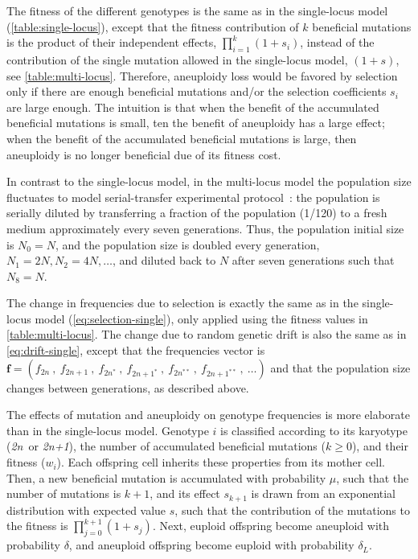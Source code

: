 \documentclass[12pt]{extarticle}
\let\vec\mathbf
\newcommand{\euwt}{\emph{2n}}
\newcommand{\anwt}{\emph{2n+1}}
\begin{document}
The fitness of the different genotypes is the same as in the single-locus model (\autoref{table:single-locus}), except that the fitness contribution of $k$ beneficial mutations is the product of their independent effects, $\prod_{i=1}^k(1+s_i)$, instead of the contribution of the single mutation allowed in the single-locus model, $(1+s)$, see \autoref{table:multi-locus}.
Therefore, aneuploidy loss would be favored by selection only if there are enough beneficial mutations and/or the selection coefficients $s_i$ are large enough. The intuition is that when the benefit of the accumulated beneficial mutations is small, ten the benefit of aneuploidy has a large effect; when the benefit of the accumulated beneficial mutations is large, then aneuploidy is no longer beneficial due of its fitness cost.

In contrast to the single-locus model, in the multi-locus model the population size fluctuates to model serial-transfer experimental protocol~\citep{Yona2012}: the population is serially diluted by transferring a fraction of the population (1/120) to a fresh medium approximately every seven generations. 
Thus, the population initial size is $N_0 = N$, and the population size is doubled every generation, $N_1=2N, N_2=4N, \ldots$, and diluted back to $N$ after seven generations such that $N_8=N$.

The change in frequencies due to selection is exactly the same as in the single-locus model (\autoref{eq:selection-single}), only applied using the fitness values in \autoref{table:multi-locus}. The change due to random genetic drift is also the same as in \autoref{eq:drift-single}, except that the frequencies vector is $\vec{f}=(f_{2n}\ ,\ f_{2n+1}\ ,\ f_{2n^*}\ ,\ f_{2n+1^*}\ ,\ f_{2n^{**}}\ ,\ f_{2n+1^{**}}\ ,\ \ldots)$ and that the population size changes between generations, as described above.

The effects of mutation and aneuploidy on genotype frequencies is more elaborate than in the single-locus model.
Genotype $i$ is classified according to its karyotype (\euwt\ or \anwt), the number of accumulated beneficial mutations ($k \ge 0$), and their fitness ($w_i$).
Each offspring cell inherits these properties from its mother cell.
Then, a new beneficial mutation is accumulated with probability $\mu$, such that the number of mutations is $k+1$, and its effect $s_{k+1}$ is drawn from an exponential distribution with expected value $s$, such that the contribution of the mutations to the fitness is $\prod_{j=0}^{k+1}{(1+s_j)}$.
Next, euploid offspring become aneuploid with probability $\delta$, and aneuploid offspring become euploid with probability $\delta_L$.
\end{document}
